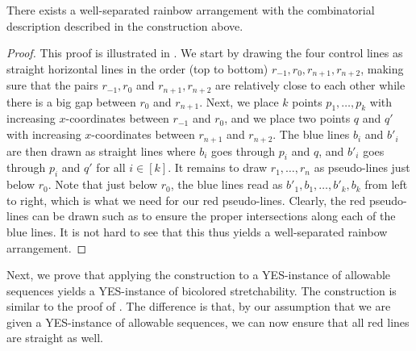 \documentclass[a4paper,UKenglish,cleveref, autoref, thm-restate, nolineno]{socg-lipics-v2021}
\newcommand{\AS}{allowable sequences\xspace}
\begin{document}
\begin{lemma}
\label{lemma:bic_stretch_1}
    There exists a well-separated rainbow arrangement with the combinatorial description described in the construction above. 
\end{lemma}
\begin{proof}
    This proof is illustrated in . We start by drawing the four control lines as straight horizontal lines in the order (top to bottom) $r_{-1}, r_0, r_{n + 1}, r_{n + 2}$, making sure that the pairs $r_{-1}, r_0$ and $r_{n+ 1}, r_{n + 2}$ are relatively close to each other while there is a big gap between $r_0$ and $r_{n + 1}$. Next, we place $k$ points $p_1, \dots, p_k$ with increasing $x$-coordinates between $r_{-1}$ and $r_0$, and we place two points $q$ and $q'$ with increasing $x$-coordinates between $r_{n + 1}$ and $r_{n + 2}$. The blue lines $b_i$ and $b'_i$ are then drawn as straight lines where $b_i$ goes through $p_i$ and $q$, and $b'_i$ goes through $p_i$ and $q'$ for all $i \in [k]$. It remains to draw $r_1, \dots, r_n$ as pseudo-lines just below $r_0$. Note that just below $r_0$, the blue lines read as $b'_1, b_1, \dots, b'_k, b_k$ from left to right, which is what we need for our red pseudo-lines. Clearly, the red pseudo-lines can be drawn such as to ensure the proper intersections along each of the blue lines. It is not hard to see that this thus yields a well-separated rainbow arrangement.
\end{proof}

Next, we prove that applying the construction to a YES-instance of \AS yields a YES-instance of bicolored stretchability. The construction is similar to the proof of . The difference is that, by our assumption that we are given a YES-instance of \AS, we can now ensure that all red lines are straight as well.
\end{document}
